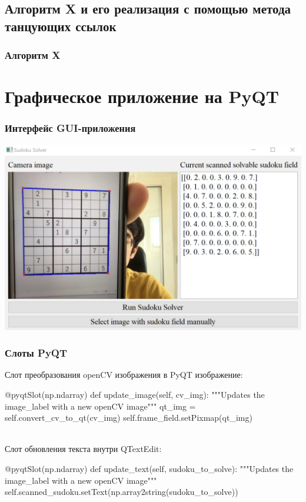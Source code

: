 \documentclass{beamer}
\begin{document}
\subsection{Алгоритм X и его реализация с помощью метода танцующих ссылок}
\begin{frame}
\frametitle{Алгоритм X}

\end{frame}



\section{Графическое приложение на PyQT}

\begin{frame}
\frametitle{Интерфейс GUI-приложения}
\includegraphics[width=\textwidth]{sudoku_app_in_action}
\end{frame}

\begin{frame}[fragile]
\frametitle{Слоты PyQT}

Слот преобразования openCV изображения в PyQT изображение:
\begin{pythoncode}
    @pyqtSlot(np.ndarray)
    def update_image(self, cv_img):
        """Updates the image_label with a new openCV image"""
        qt_img = self.convert_cv_to_qt(cv_img)
        self.frame_field.setPixmap(qt_img)
\end{pythoncode}
\ \\
Слот обновления текста внутри QTextEdit:
\begin{pythoncode}
    @pyqtSlot(np.ndarray)
    def update_text(self, sudoku_to_solve):
        """Updates the image_label with a new openCV image"""
        self.scanned_sudoku.setText(np.array2string(sudoku_to_solve))
\end{pythoncode}

\end{frame}
\end{document}
